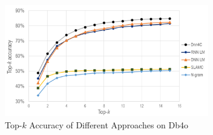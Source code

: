 


\begin{figure}[t]
\centering
\includegraphics[width=3.5in]{db4o-new-3.pdf} %
\vspace{-0.05in}
\caption{Top-$k$ Accuracy of Different Approaches on Db4o}
\label{approachesfig}
\end{figure}

%
%

